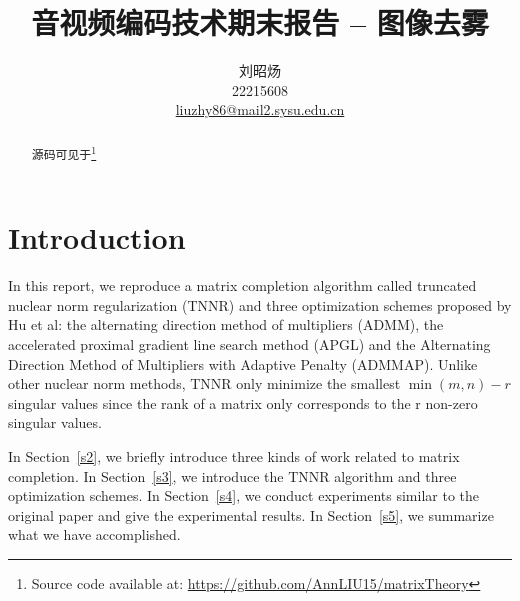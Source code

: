 \documentclass[fontset=windows]{article}
\title{音视频编码技术期末报告 -- 图像去雾}
\author{%
    刘昭炀\\ %
    22215608\\
    \href{mailto:liuzhy86@mail2.sysu.edu.cn}{liuzhy86@mail2.sysu.edu.cn}\\
}
\begin{document}
{

\maketitle

\begin{abstract}
源码可见于\footnote{Source code available at: \url{https://github.com/AnnLIU15/matrixTheory}}
\end{abstract}


\section{Introduction}


In this report, we reproduce a matrix completion algorithm called truncated nuclear norm regularization (TNNR) and three optimization schemes proposed by Hu et al\cite{hu.he201309}: the alternating direction method of multipliers\cite{boyd2011distributed} (ADMM), the accelerated proximal gradient line search method\cite{beck2009fast} (APGL) and the Alternating Direction Method of Multipliers with Adaptive Penalty (ADMMAP). 
Unlike other nuclear norm methods, TNNR only minimize the smallest $\min(m, n) - r$  singular values since the rank of a matrix only corresponds to the r non-zero singular values. 

In Section~\ref{s2}, we briefly introduce three kinds of work related to matrix completion. In Section~\ref{s3}, we introduce the TNNR algorithm and three optimization schemes. In Section~\ref{s4}, we conduct experiments similar to the original paper and give the experimental results. In Section~\ref{s5}, we summarize what we have accomplished.


}
\end{document}
